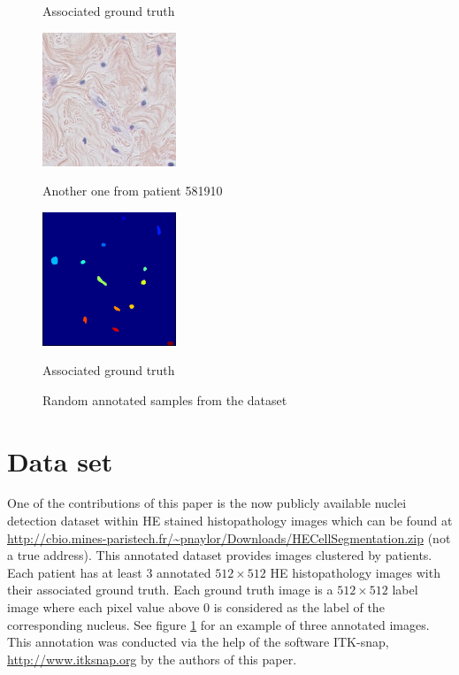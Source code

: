 \documentclass{article}
\begin{document}
\begin{figure}[htb]
\begin{minipage}[b]{0.48\linewidth}
  \centerline{Associated ground truth}\medskip
\end{minipage}
%
%
\begin{minipage}[b]{.48\linewidth}
  \centering
  \centerline{\includegraphics[width=4.0cm]{RGB_3}}
  \centerline{Another one from patient 581910}\medskip
\end{minipage}
\hfill
\begin{minipage}[b]{0.48\linewidth}
  \centering
  \centerline{\includegraphics[width=4.0cm]{GT_3}}
  \centerline{Associated ground truth}\medskip
\end{minipage}
%
\caption{Random annotated samples from the dataset}
\label{fig:annotation}
%
\end{figure}


\section{Data set}
\label{sec:dataset}

\noindent One of the contributions of this paper is the now publicly available 
nuclei detection dataset within HE stained histopathology images which 
can be found at \url{http://cbio.mines-paristech.fr/~pnaylor/Downloads/HECellSegmentation.zip} 
(not a true address). This annotated dataset provides images clustered by 
patients. Each patient has at least 3 annotated $512 \times 512$ HE 
histopathology images with their associated ground truth. Each 
ground truth image is a $512 \times 512$ label image where each pixel value above 
$0$ is considered as the label of the corresponding nucleus. 
See figure \ref{fig:annotation} for an example of 
three annotated images. This annotation was conducted via the help of 
the software ITK-snap, \cite{py06nimg} \url{http://www.itksnap.org} by
the authors of this paper. 
\end{document}
